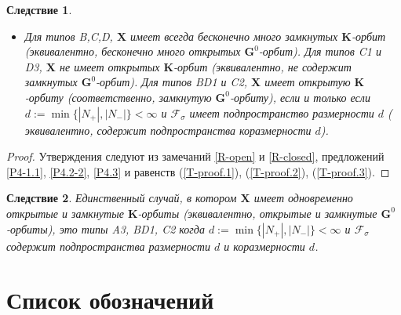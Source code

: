 \documentclass{amsart}
\newtheorem{corollary}{Следствие}
\theoremstyle{definition}
\begin{document}
\begin{corollary}
\begin{itemize}
содержит подпространства размерности $d$ и коразмерности  $d$.
\item[\rm (bcd)] Для типов B,C,D,
$\mathbf{X}$ имеет всегда бесконечно много замкнутых  $\mathbf{K}$-орбит (эквивалентно, бесконечно много открытых $\mathbf{G}^0$-орбит).
Для типов C1 и D3, $\mathbf{X}$ не имеет открытых $\mathbf{K}$-орбит (эквивалентно, не содержит замкнутых $\mathbf{G}^0$-орбит).
Для типов BD1 и C2, $\mathbf{X}$ имеет открытую $\mathbf{K}$-орбиту (соответственно, замкнутую $\mathbf{G}^0$-орбиту),
если и только если $d:=\min\{|N_+|,|N_-|\}<\infty$ и $\mathcal{F}_\sigma$ имеет подпространство размерности $d$  ( эквивалентно, содержит подпространства коразмерности $d$).
\end{itemize}
\end{corollary}

\begin{proof}
Утверждения следуют из замечаний \ref{R-open} и \ref{R-closed}, предложений \ref{P4-1.1}, \ref{P4.2-2}, \ref{P4.3} и равенств (\ref{T-proof.1}), (\ref{T-proof.2}), (\ref{T-proof.3}).
\end{proof}


\begin{corollary}
Единственный случай, в котором $\mathbf{X}$ имеет одновременно открытые и замкнутые $\mathbf{K}$-орбиты (эквивалентно, открытые и замкнутые $\mathbf{G}^0$-орбиты), это типы
A3, BD1, C2 когда $d:=\min\{|N_+|,|N_-|\}<\infty$ и $\mathcal{F}_\sigma$
содержит подпространства размерности $d$ и коразмерности $d$.
\end{corollary}

\section*{Список обозначений}
\end{document}
